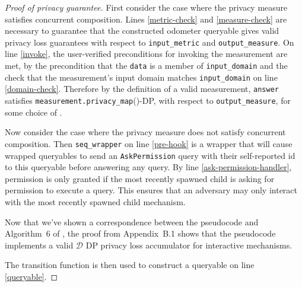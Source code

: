 \documentclass{article}
\begin{document}
\begin{proof}[Proof of privacy guarantee]
    First consider the case where the privacy measure satisfies concurrent composition.
    Lines \ref{metric-check} and \ref{measure-check} are necessary to guarantee that the constructed odometer queryable 
    gives valid privacy loss guarantees with respect to \texttt{input\_metric} and \texttt{output\_measure}.
    On line \ref{invoke}, the user-verified preconditions for invoking the measurement are met,
    by the precondition that the \texttt{data} is a member of \texttt{input\_domain}
    and the check that the measurement's input domain matches \texttt{input\_domain} on line \ref{domain-check}.
    Therefore by the definition of a valid measurement,
    \texttt{answer} satisfies \texttt{measurement.privacy\_map}(\din)-DP, with respect to \texttt{output\_measure}, 
    for some choice of \din.

    Now consider the case where the privacy measure does not satisfy concurrent composition.
    Then \texttt{seq\_wrapper} on line \ref{pre-hook} is a wrapper that will cause wrapped queryables 
    to send an \texttt{AskPermission} query with their self-reported id to this queryable before answering any query.
    By line \ref{ask-permission-handler}, permission is only granted 
    if the most recently spawned child is asking for permission to execute a query.
    This ensures that an adversary may only interact with the most recently spawned child mechanism.
    
    
    Now that we've shown a correspondence between the pseudocode and Algorithm~6 of \cite{haney2023concurrentcompositioninteractivedifferential},
    the proof from Appendix~B.1 shows that the pseudocode implements a valid $\mathcal{D}$ DP privacy loss accumulator for interactive mechanisms.

    The transition function is then used to construct a queryable on line \ref{queryable}.
\end{proof}



\end{document}
